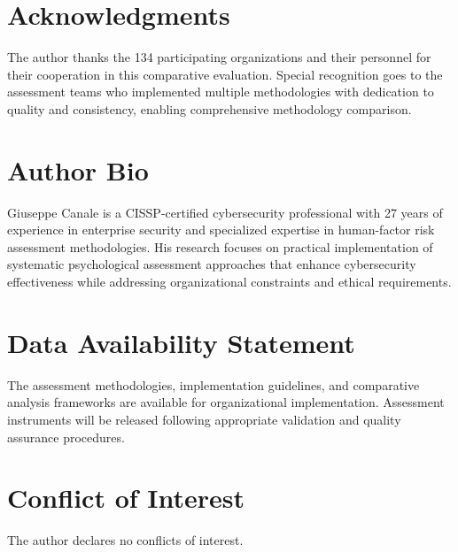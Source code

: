 \documentclass[10pt, twocolumn]{article}
\begin{document}
\section*{Acknowledgments}

The author thanks the 134 participating organizations and their personnel for their cooperation in this comparative evaluation. Special recognition goes to the assessment teams who implemented multiple methodologies with dedication to quality and consistency, enabling comprehensive methodology comparison.

\section*{Author Bio}

Giuseppe Canale is a CISSP-certified cybersecurity professional with 27 years of experience in enterprise security and specialized expertise in human-factor risk assessment methodologies. His research focuses on practical implementation of systematic psychological assessment approaches that enhance cybersecurity effectiveness while addressing organizational constraints and ethical requirements.

\section*{Data Availability Statement}

The assessment methodologies, implementation guidelines, and comparative analysis frameworks are available for organizational implementation. Assessment instruments will be released following appropriate validation and quality assurance procedures.

\section*{Conflict of Interest}

The author declares no conflicts of interest.
\end{document}
